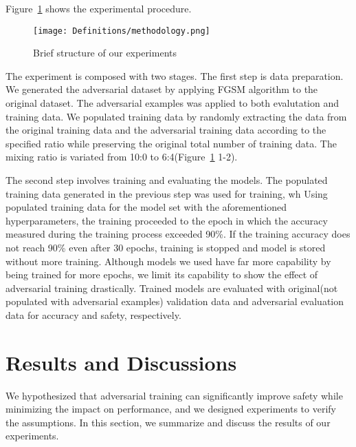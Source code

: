 \documentclass[symmetry,article,submit,moreauthors,pdftex]{Definitions/mdpi}
\begin{document}
Figure~\ref{methodology} shows the experimental procedure.

\begin{figure}[H]
\texttt{[image: Definitions/methodology.png]}
\caption{Brief structure of our experiments\label{methodology}}
\end{figure} 

The experiment is composed with two stages.
The first step is data preparation. 
We generated the adversarial dataset by applying FGSM algorithm to the original dataset.
The adversarial examples was applied to both evalutation and training data.
We populated training data by randomly extracting the data from the original training data and the adversarial training data according to the specified ratio while preserving the original total number of training data. The mixing ratio is variated from 10:0 to 6:4(Figure~\ref{methodology} 1-2).

The second step involves training and evaluating the models.
The populated training data generated in the previous step was used for training, wh 
Using populated training data for the model set with the aforementioned hyperparameters, the training proceeded to the epoch in which the accuracy measured during the training process exceeded 90\%.
If the training accuracy does not reach 90\% even after 30 epochs, training is stopped and model is stored without more training. Although models we used have far more capability by being trained for more epochs, we limit its capability to show the effect of adversarial training drastically.
Trained models are evaluated with original(not populated with adversarial examples) validation data and adversarial evaluation data for accuracy and safety, respectively.

\section{Results and Discussions}

We hypothesized that adversarial training can significantly improve safety while minimizing the impact on performance, and we designed experiments to verify the assumptions.
In this section, we summarize and discuss the results of our experiments.
\end{document}
